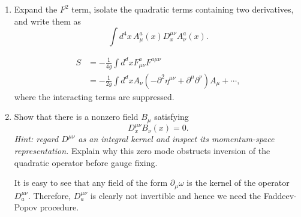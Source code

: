 \begin{enumerate}[label=\alph*)]
    \item Expand the $F^2$ term, isolate the quadratic terms containing two
    derivatives, and write them as
    \begin{equation}
        \int d^4x\,A_\mu^a(x)D_x^{\mu\nu}A_\nu^a(x).
    \end{equation}
    \begin{solution}
        \begin{equation}
            \begin{aligned}
                S &= -\frac{1}{4g}\int d^dx F_{\mu\nu}^a F^{a\mu\nu}\\
                &=-\frac{1}{2g}\int d^dx A_\nu(-\partial^2\eta^{\mu\nu} + \partial^\mu\partial^\nu)A_\mu + \cdots,
            \end{aligned}
        \end{equation}
        where the interacting terms are suppressed.
    \end{solution}

    \item Show that there is a nonzero field $B_\mu$ satisfying
    \begin{equation}
        D_x^{\mu\nu}B_\nu(x)=0.
    \end{equation}
    \textit{Hint: regard $D^{\mu\nu}$ as an integral kernel and inspect its
    momentum-space representation.}
    Explain why this zero mode obstructs inversion of the quadratic operator
    before gauge fixing.
    \begin{solution}
        It is easy to see that any field of the form $\partial_\mu \omega$ is the kernel of the operator $D^{\mu\nu}_a$. Therefore, $D^{\mu\nu}_a$ is clearly not invertible and hence we need the Faddeev-Popov procedure.
    \end{solution}
\end{enumerate}
